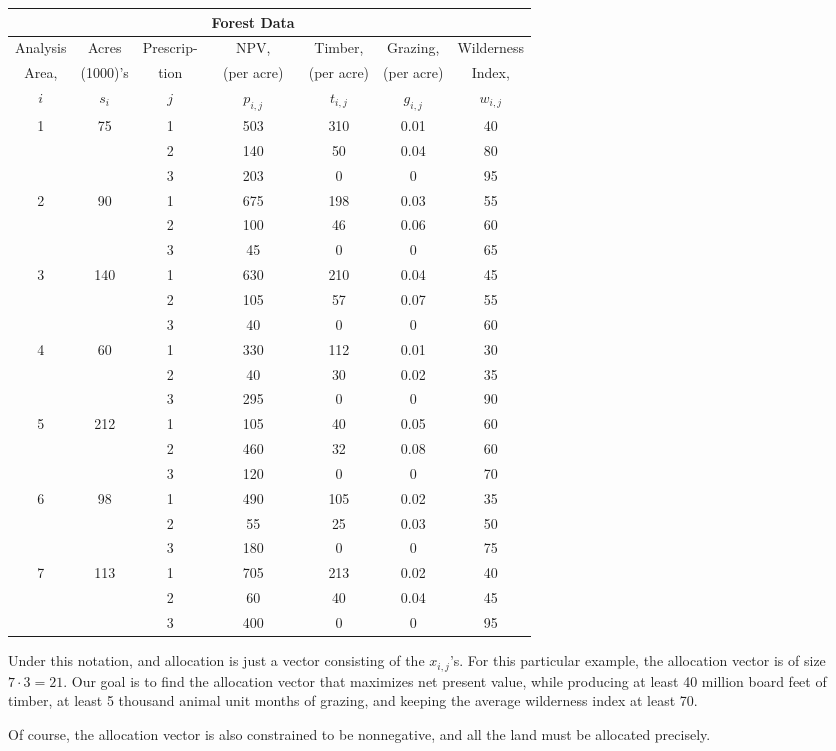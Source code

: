 \begin{table}[h]
\centering
    \begin{tabular}{c c c c c c c}
&&&Forest Data&&& \\
\hline
Analysis & Acres &Prescrip-&NPV,&Timber,&Grazing,&Wilderness \\
Area,&(1000)'s &tion&(per acre) &(per acre)&(per acre)& Index,\\
$i$ &$s_i$&$j$& $p_{i,j}$ & $t_{i,j}$&$g_{i,j}$&$w_{i,j}$ \\\hline
1&	75	&1	&503	&310	&0.01&	40\\
&&		2&	140&	50&	0.04	&80\\
&&		3&	203&	0&	0&	95\\ \hline
2&	90&	1	&675&	198&	0.03&	55\\
&&		2&	100&	46&	0.06&	60\\
&&		3&	45&	0&	0&	65\\ \hline
3&	140&	1	&630&	210	&0.04&	45\\
&&		2&	105&	57&	0.07&	55\\
&&		3&	40	&0&	0&	60\\ \hline
4	&60&	1&	330&	112&	0.01&	30\\
&&		2	&40&	30&	0.02&	35\\
&&		3&	295&	0&	0	&90\\ \hline
5	&212&	1	&105	&40	&0.05&	60\\
&&		2	&460&	32	&0.08&	60\\
&& 3	&120&0&	0	&70\\ \hline
6	&98	&1	&490	&105	&0.02	&35\\
&&		2&	55	&25	&0.03	&50\\
&&		3	&180	&0	&0	&75\\ \hline
7&	113&	1	&705	&213&	0.02	&40\\
&&		2&	60	&40	&0.04&	45\\
&&		3	&400	&0	&0	&95\\
\hline
    \end{tabular}
\label{tab:forest}
\end{table}

Under this notation, and allocation is just a vector consisting of the $x_{i,j}$'s. For this particular
example, the allocation vector is of size $7\cdot 3 = 21$. 
Our goal is to find the allocation vector that maximizes net present value, while producing at least 40 million
board feet of timber, at least 5 thousand animal unit months of grazing, and keeping the average wilderness index at least 70.

Of course, the allocation vector is also constrained to be nonnegative, and all the land must be allocated 
precisely. 

